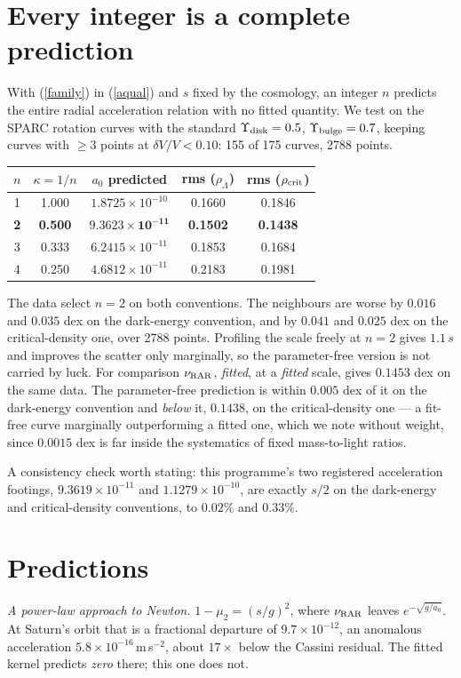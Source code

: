 \documentclass[11pt,letterpaper]{article}
\begin{document}
\section{Every integer is a complete prediction}
With (\ref{family}) in (\ref{aqual}) and $s$ fixed by the cosmology, an integer $n$ predicts the entire radial acceleration relation with no fitted quantity. We test on the SPARC rotation curves \cite{sparc} with the standard $\Upsilon_{\rm disk}=0.5$, $\Upsilon_{\rm bulge}=0.7$, keeping curves with $\ge3$ points at $\delta V/V<0.10$: 155 of 175 curves, 2788 points.

\begin{center}
\begin{tabular}{ccccc}
\toprule
$n$ & $\kappa=1/n$ & $a_0$ predicted & rms ($\rho_\Lambda$) & rms ($\rho_{\rm crit}$) \\
\midrule
1 & 1.000 & $1.8725\times10^{-10}$ & 0.1660 & 0.1846 \\
\textbf{2} & \textbf{0.500} & $\mathbf{9.3623\times10^{-11}}$ & \textbf{0.1502} & \textbf{0.1438} \\
3 & 0.333 & $6.2415\times10^{-11}$ & 0.1853 & 0.1684 \\
4 & 0.250 & $4.6812\times10^{-11}$ & 0.2183 & 0.1981 \\
\bottomrule
\end{tabular}
\end{center}

The data select $n=2$ on both conventions. The neighbours are worse by $0.016$ and $0.035$ dex on the dark-energy convention, and by $0.041$ and $0.025$ dex on the critical-density one, over 2788 points. Profiling the scale freely at $n=2$ gives $1.1\,s$ and improves the scatter only marginally, so the parameter-free version is not carried by luck. For comparison $\nu_{\rm RAR}$, \emph{fitted}, at a \emph{fitted} scale, gives $0.1453$ dex on the same data. The parameter-free prediction is within $0.005$ dex of it on the dark-energy convention and \emph{below} it, $0.1438$, on the critical-density one --- a fit-free curve marginally outperforming a fitted one, which we note without weight, since $0.0015$ dex is far inside the systematics of fixed mass-to-light ratios.

A consistency check worth stating: this programme's two registered acceleration footings, $9.3619\times10^{-11}$ and $1.1279\times10^{-10}$, are exactly $s/2$ on the dark-energy and critical-density conventions, to $0.02\%$ and $0.33\%$.

\section{Predictions}
\emph{A power-law approach to Newton.} $1-\mu_2=(s/g)^2$, where $\nu_{\rm RAR}$ leaves $e^{-\sqrt{g/a_0}}$. At Saturn's orbit that is a fractional departure of $9.7\times10^{-12}$, an anomalous acceleration $5.8\times10^{-16}\,$m$\,$s$^{-2}$, about $17\times$ below the Cassini residual. The fitted kernel predicts \emph{zero} there; this one does not.
\end{document}

